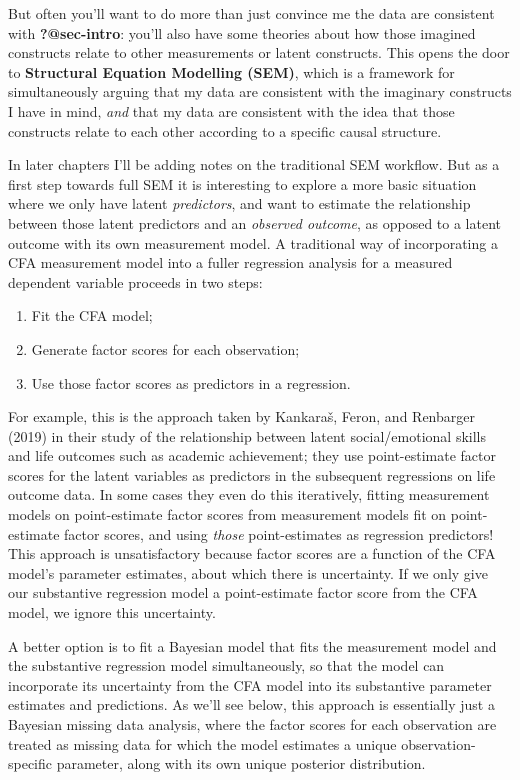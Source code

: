 \documentclass[
  letterpaper,
  DIV=11,
  numbers=noendperiod]{scrreprt}
\providecommand{\tightlist}{%
  \setlength{\itemsep}{0pt}\setlength{\parskip}{0pt}}\usepackage{longtable,booktabs,array}
\begin{document}
But often you'll want to do more than just convince me the data are
consistent with \textbf{?@sec-intro}: you'll also have some theories
about how those imagined constructs relate to other measurements or
latent constructs. This opens the door to \textbf{Structural Equation
Modelling (SEM)}, which is a framework for simultaneously arguing that
my data are consistent with the imaginary constructs I have in mind,
\emph{and} that my data are consistent with the idea that those
constructs relate to each other according to a specific causal
structure.

In later chapters I'll be adding notes on the traditional SEM workflow.
But as a first step towards full SEM it is interesting to explore a more
basic situation where we only have latent \emph{predictors}, and want to
estimate the relationship between those latent predictors and an
\emph{observed outcome}, as opposed to a latent outcome with its own
measurement model. A traditional way of incorporating a CFA measurement
model into a fuller regression analysis for a measured dependent
variable proceeds in two steps:

\begin{enumerate}
\def\labelenumi{\arabic{enumi}.}
\tightlist
\item
  Fit the CFA model;
\item
  Generate factor scores for each observation;
\item
  Use those factor scores as predictors in a regression.
\end{enumerate}

For example, this is the approach taken by Kankaraš, Feron, and
Renbarger (2019) in their study of the relationship between latent
social/emotional skills and life outcomes such as academic achievement;
they use point-estimate factor scores for the latent variables as
predictors in the subsequent regressions on life outcome data. In some
cases they even do this iteratively, fitting measurement models on
point-estimate factor scores from measurement models fit on
point-estimate factor scores, and using \emph{those} point-estimates as
regression predictors! This approach is unsatisfactory because factor
scores are a function of the CFA model's parameter estimates, about
which there is uncertainty. If we only give our substantive regression
model a point-estimate factor score from the CFA model, we ignore this
uncertainty.

A better option is to fit a Bayesian model that fits the measurement
model and the substantive regression model simultaneously, so that the
model can incorporate its uncertainty from the CFA model into its
substantive parameter estimates and predictions. As we'll see below,
this approach is essentially just a Bayesian missing data analysis,
where the factor scores for each observation are treated as missing data
for which the model estimates a unique observation-specific parameter,
along with its own unique posterior distribution.
\end{document}
